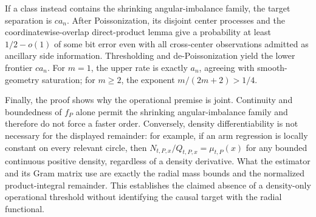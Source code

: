 If a class instead contains the shrinking angular-imbalance family, the target separation is \(ca_n\).  After Poissonization, its disjoint center processes and the coordinatewise-overlap direct-product lemma give a probability at least \(1/2-o(1)\) of some bit error even with all cross-center observations admitted as ancillary side information.  Thresholding and de-Poissonization yield the lower frontier \(ca_n\).  For \(m=1\), the upper rate is exactly \(a_n\), agreeing with smooth-geometry saturation; for \(m\geq2\), the exponent \(m/(2m+2)>1/4\).

Finally, the proof shows why the operational premise is joint.  Continuity and boundedness of \(f_P\) alone permit the shrinking angular-imbalance family and therefore do not force a faster order.  Conversely, density differentiability is not necessary for the displayed remainder: for example, if an arm regression is locally constant on every relevant circle, then \(N_{t,P,x}/Q_{t,P,x}=\mu_{t,P}(x)\) for any bounded continuous positive density, regardless of a density derivative.  What the estimator and its Gram matrix use are exactly the radial mass bounds and the normalized product-integral remainder.  This establishes the claimed absence of a density-only operational threshold without identifying the causal target with the radial functional.